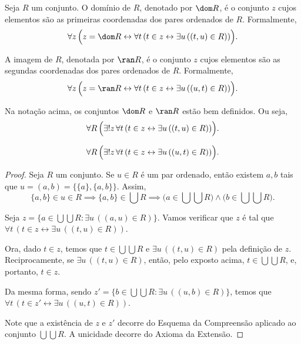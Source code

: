 \begin{definition}[$\BST$]\label{def:dominioEImagem}
    Seja $R$ um conjunto.
    O domínio de $R$, denotado por $\dom R$, é o conjunto $z$ cujos elementos são as primeiras coordenadas dos pares ordenados de $R$.
    Formalmente,
    \[
        \forall z\, \Bigl(z = \dom R \leftrightarrow \forall t\, (t \in z \leftrightarrow \exists u\, ((t, u) \in R))\Bigr).
    \]

    A imagem de $R$, denotada por $\ran R$, é o conjunto $z$ cujos elementos são as segundas coordenadas dos pares ordenados de $R$.
    Formalmente,
    \[
        \forall z\, \Bigl(z = \ran R \leftrightarrow \forall t\, (t \in z \leftrightarrow \exists u\, ((u, t) \in R))\Bigr).
    \]
\end{definition}
\begin{lemma}[$\BST$]\label{lem:existenciaDoDominioEImagem}
    Na notação acima, os conjuntos $\dom R$ e $\ran R$ estão bem definidos.
    Ou seja,
    \[
        \forall R\, \Bigl(\exists! z\, \forall t\, (t \in z \leftrightarrow \exists u\, ((t, u) \in R))\Bigr).
    \]

    \[
        \forall R\, \Bigl(\exists! z\, \forall t\, (t \in z \leftrightarrow \exists u\, ((u, t) \in R))\Bigr).
    \]
\end{lemma}
\begin{proof}
    Seja $R$ um conjunto. Se $u \in R$ é um par ordenado, então existem $a, b$ tais que $u = (a, b)=\{\{a\}, \{a, b\}\}$.
    Assim,
    \[
        \{a, b\} \in u \in R \implies \{a, b\} \in \bigcup R \implies \bigl(a \in \bigcup\bigcup R\bigr) \land \bigl(b \in \bigcup\bigcup R\bigr).
    \]

    Seja $z=\{a \in \bigcup\bigcup R : \exists u\, ((a, u) \in R)\}$.
    Vamos verificar que $z$ é tal que $\forall t\, (t \in z \leftrightarrow \exists u\, ((t, u) \in R))$.

    Ora, dado $t \in z$, temos que $t \in \bigcup\bigcup R$ e $\exists u\, ((t, u) \in R)$ pela definição de $z$.
    Reciprocamente, se $\exists u\, ((t, u) \in R)$, então, pelo exposto acima, $t \in \bigcup\bigcup R$, e, portanto, $t \in z$.

    Da mesma forma, sendo $z'=\{b \in \bigcup\bigcup R : \exists u\, ((u, b) \in R)\}$, temos que $\forall t\, (t \in z' \leftrightarrow \exists u\, ((u, t) \in R))$.

    Note que a existência de $z$ e $z'$ decorre do Esquema da Compreensão aplicado ao conjunto $\bigcup\bigcup R$.
    A unicidade decorre do Axioma da Extensão.
\end{proof}

